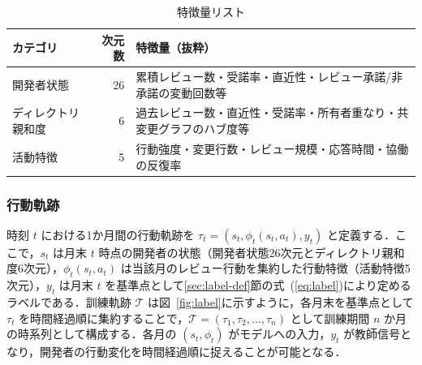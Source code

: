 \documentclass[submit,noauthor,ses,dvipdfmx]{ipsj}
\begin{document}
\begin{table}[t]
\vspace{-4mm}
\caption{特徴量リスト}
\label{tab:features}
\centering
\begin{tabular}{p{1.7cm}rp{4.5cm}}
\hline
カテゴリ & 次元数 & 特徴量（抜粋） \\
\hline
開発者状態 & 26 & 累積レビュー数・受諾率・直近性・レビュー承諾/非承諾の変動回数等 \\
ディレクトリ親和度 & 6 & 過去レビュー数・直近性・受諾率・所有者重なり・共変更グラフのハブ度等 \\
活動特徴 & 5 & 行動強度・変更行数・レビュー規模・応答時間・協働の反復率\\
\hline
\end{tabular}
\end{table}

\subsubsection{行動軌跡}

時刻 $t$ における1か月間の行動軌跡を $\tau_t = (s_t, \phi_{t}(s_t, a_t), y_t)$ と定義する．ここで，$s_t$ は月末 $t$ 時点の開発者の状態（開発者状態26次元とディレクトリ親和度6次元），$\phi_t(s_t, a_t)$ は当該月のレビュー行動を集約した行動特徴（活動特徴5次元），$y_t$ は月末 $t$ を基準点として\ref{sec:label-def}節の式~(\ref{eq:label})により定めるラベルである．訓練軌跡 $\mathcal{T}$ は図~\ref{fig:label}に示すように，各月末を基準点として $\tau_t$ を時間経過順に集約することで，$\mathcal{T} = (\tau_1, \tau_2, \ldots, \tau_n)$ として訓練期間 $n$ か月の時系列として構成する．各月の $(s_t, \phi_t)$ がモデルへの入力，$y_t$ が教師信号となり，開発者の行動変化を時間経過順に捉えることが可能となる．
\end{document}
